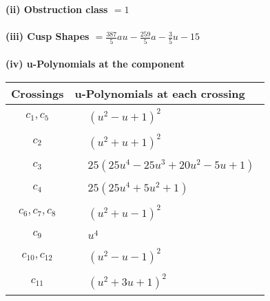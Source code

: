\documentclass[1p]{elsarticle_modified}
\theoremstyle{definition}
\begin{document}
\flushleft \textbf{(ii) Obstruction class $= 1$}\\~\\
\flushleft \textbf{(iii) Cusp Shapes $= \frac{387}{5} a u-\frac{259}{5} a-\frac{3}{5} u-15$}\\~\\
\newpage\renewcommand{\arraystretch}{1}
\flushleft \textbf{(iv) u-Polynomials at the component}\newline \\
\begin{tabular}{m{50pt}|m{274pt}}
Crossings & \hspace{64pt}u-Polynomials at each crossing \\
\hline $$\begin{aligned}c_{1},c_{5}\end{aligned}$$&$\begin{aligned}
&(u^2- u+1)^2
\end{aligned}$\\
\hline $$\begin{aligned}c_{2}\end{aligned}$$&$\begin{aligned}
&(u^2+u+1)^2
\end{aligned}$\\
\hline $$\begin{aligned}c_{3}\end{aligned}$$&$\begin{aligned}
&25(25 u^4-25 u^3+20 u^2-5 u+1)
\end{aligned}$\\
\hline $$\begin{aligned}c_{4}\end{aligned}$$&$\begin{aligned}
&25(25 u^4+5 u^2+1)
\end{aligned}$\\
\hline $$\begin{aligned}c_{6},c_{7},c_{8}\end{aligned}$$&$\begin{aligned}
&(u^2+u-1)^2
\end{aligned}$\\
\hline $$\begin{aligned}c_{9}\end{aligned}$$&$\begin{aligned}
&u^4
\end{aligned}$\\
\hline $$\begin{aligned}c_{10},c_{12}\end{aligned}$$&$\begin{aligned}
&(u^2- u-1)^2
\end{aligned}$\\
\hline $$\begin{aligned}c_{11}\end{aligned}$$&$\begin{aligned}
&(u^2+3 u+1)^2
\end{aligned}$\\
\hline
\end{tabular}\\~\\
\end{document}
